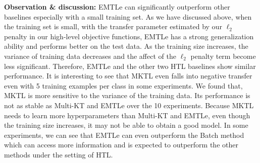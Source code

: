 \textbf{Observation \& discussion:} EMTLe can significantly outperform other baselines especially with a small training set. %
As we have discussed above, when the training set is small, with the transfer parameter estimated by our $\ell_2$ penalty in our high-level objective functions, EMTLe has a strong generalization ability and performs better on the test data. As the training size increases, the variance of training data decreases and the affect of the $\ell_2$ penalty term become less significant. Therefore, EMTLe and the other two HTL baselines show similar performance. 
It is interesting to see that MKTL even falls into negative transfer even with 5 training examples per class in some experiments. We found that, MKTL is more sensitive to the variance of the training data. Its performance is not as stable as Multi-KT and EMTLe over the 10 experiments. Because MKTL needs to learn more hyperparameters than Multi-KT and EMTLe, even though the training size increases, it may not be able to obtain a good model. 
In some experiments, we can see that EMTLe can even outperform the Batch method which can access more information and is expected to outperform the other methods under the setting of HTL.